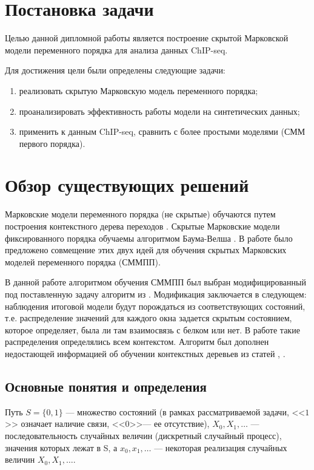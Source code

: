 \documentclass{matmex-diploma-custom}
\begin{document}
\section{Постановка задачи}
Целью данной дипломной работы является построение скрытой Марковской модели переменного
порядка для анализа данных ChIP-seq.

Для достижения цели были определены следующие задачи:
\begin{enumerate}
\item
реализовать скрытую Марковскую модель
переменного порядка;
\item
проанализировать 
эффективность работы модели на синтетических
данных;
\item
применить к данным ChIP-seq, сравнить с более простыми моделями (СММ
первого порядка).
\end{enumerate}


\section{Обзор существующих решений}
Марковские модели переменного порядка (не скрытые) обучаются путем построения контекстного дерева переходов \cite{Buhlmann1999}. Скрытые Марковские модели фиксированного порядка обучаемы алгоритмом Баума-Велша \cite{Rabiner1989}.
В работе \cite{Wang2006} было предложено совмещение этих двух идей для обучения скрытых Марковских моделей переменного порядка (СММПП).

В данной работе алгоритмом обучения СММПП был выбран модифицированный под поставленную задачу алгоритм  из \cite{Wang2006}. 
Модификация заключается в следующем: наблюдения итоговой модели будут порождаться из соответствующих состояний, т.е. распределение значений для каждого окна задается скрытым состоянием, которое определяет, была ли там взаимосвязь с белком или нет. В работе \cite{Wang2006} такие распределения определялись всем контекстом. 
Алгоритм был дополнен недостающей информацией об обучении контекстных деревьев из статей \cite{Buhlmann1999}, \cite{Dumont2014}.

\subsection{Основные понятия и определения}

Путь 
$ S = \{0, 1\} $ --- множество состояний (в рамках рассматриваемой задачи, <<$1$>> означает наличие связи, <<$0$>>--- ее отсутствие), 
$X_0, X_1, \ldots $ --- последовательность случайных величин (дискретный случайный процесс), значения которых лежат в S, а
$x_0, x_1, \ldots$ --- некоторая реализация случайных величин $X_0, X_1, \ldots $.
\end{document}
